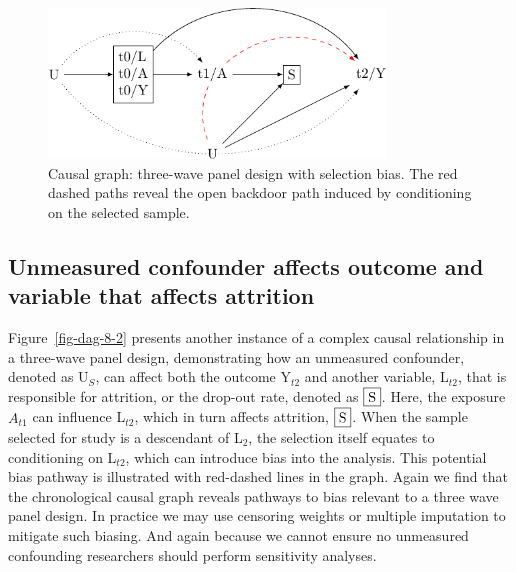 \documentclass[
  singlecolumn]{report}
\begin{document}
\begin{figure}

{\centering \includegraphics[width=0.8\textwidth,height=\textheight]{causal-dags_files/figure-pdf/fig-dag-8-1.pdf}

}

\caption{\label{fig-dag-8}Causal graph: three-wave panel design with
selection bias. The red dashed paths reveal the open backdoor path
induced by conditioning on the selected sample.}

\end{figure}

\hypertarget{unmeasured-confounder-affects-outcome-and-variable-that-affects-attrition}{%
\subsection{Unmeasured confounder affects outcome and variable that
affects
attrition}\label{unmeasured-confounder-affects-outcome-and-variable-that-affects-attrition}}

Figure~\ref{fig-dag-8-2} presents another instance of a complex causal
relationship in a three-wave panel design, demonstrating how an
unmeasured confounder, denoted as U\(_S\), can affect both the outcome
Y\(_{t2}\) and another variable, L\(_{t2}\), that is responsible for
attrition, or the drop-out rate, denoted as \(\framebox{S}\). Here, the
exposure \(A_{t1}\) can influence L\(_{t2}\), which in turn affects
attrition, \(\framebox{S}\). When the sample selected for study is a
descendant of L\(_2\), the selection itself equates to conditioning on
L\(_{t2}\), which can introduce bias into the analysis. This potential
bias pathway is illustrated with red-dashed lines in the graph. Again we
find that the chronological causal graph reveals pathways to bias
relevant to a three wave panel design. In practice we may use censoring
weights or multiple imputation to mitigate such biasing. And again
because we cannot ensure no unmeasured confounding researchers should
perform sensitivity analyses.
\end{document}
